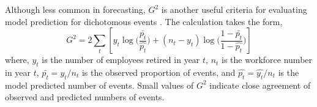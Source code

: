 \documentclass[12pt,letterpaper]{article}
\begin{document}

Although less common in forecasting, $G^2$ is another useful criteria for evaluating model prediction for dichotomous events \citep{Simonoff2013}. The calculation takes the form,
\begin{equation}
\label{eq:g2}
G^2=2\sum_{t}[y_t\log{(\frac{\bar{p_t}}{\hat{p_t}}})+ (n_t-y_t)\log{(\frac{1-\bar{p_t}}{1-\hat{p_t}}})]
\end{equation}
where, $y_t$ is the number of employees retired in year $t$, $n_t$ is the workforce number in year $t$, $\bar{p_t}={y_t}/{n_t}$ is the observed proportion of events, and $\hat{p_t}={\hat{y_t}}/{n_t} $ is the model predicted number of events.  Small values of $G^2$ indicate close agreement of observed and predicted numbers of events.




%
\end{document}
